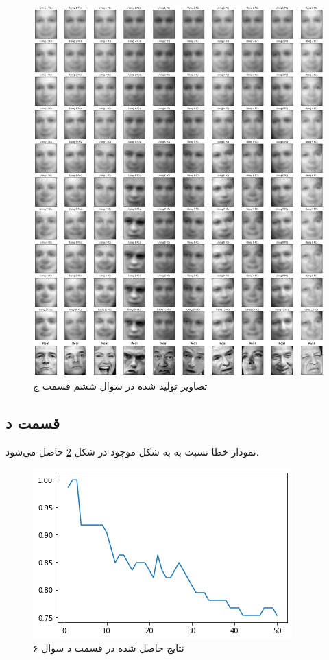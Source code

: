 \documentclass{article}
\begin{document}
\begin{figure}[h]
    \centering
    \includegraphics[scale=0.2]{images/q6/reproduced_images.png}
    \caption{تصاویر تولید شده در سوال ششم قسمت ج}
    \label{reproduced_images}
\end{figure}

\subsection*{قسمت د}

نمودار خطا نسبت به  به شکل موجود در شکل \ref{q6_all_eigenvectors} حاصل می‌شود.

\begin{figure}[h]
    \centering
    \includegraphics[scale=0.5]{images/q6/result_partd.png}
    \caption{نتایج حاصل شده در قسمت د سوال ۶}
    \label{q6_all_eigenvectors}
\end{figure}
\end{document}
